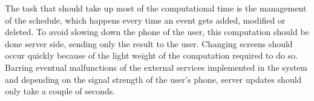 The task that should take up most of the computational time is the management of the schedule, which happens every time an event gets added, modified or deleted. To avoid slowing down the phone of the user, this computation should be done server side, sending only the result to the user.
\newline
Changing screens should occur quickly because of the light weight of the computation required to do so.
\newline
Barring eventual malfunctions of the external services implemented in the system and depending on the signal strength of the user's phone, server updates should only take a couple of seconds.